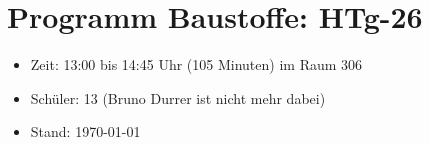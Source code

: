 \documentclass[
11.5pt,
captions=tableheading,
headings=big,
headsepline,
footsepline, 
captions=tableheading,
parskip=half-,
]{scrartcl}
\title{\fach}
\date{2024}
\newcommand{\klasse}{HTg-26\xspace}
\begin{document}
\section*{Programm Baustoffe: \klasse}
\begin{itemize}[noitemsep]
    \item Zeit: 13:00 bis 14:45 Uhr (105 Minuten) im Raum 306
    \item Schüler: 13 (Bruno Durrer ist nicht mehr dabei)
    \item Stand: \today
\end{itemize}


\vspace{0.25cm}

\setcounter{lecture}{0}
\newcommand{\nr}{\stepcounter{lecture}\thelecture} %
\end{document}
